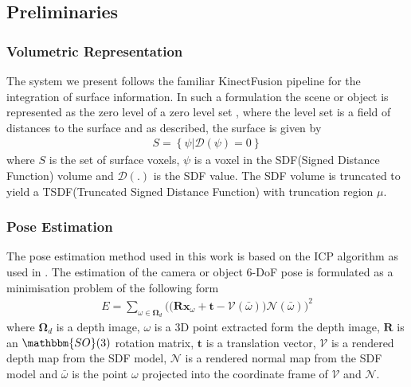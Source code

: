 \subsection{Preliminaries}
\subsubsection{Volumetric Representation}
The system we present follows the familiar KinectFusion \cite{Newcombe2011} pipeline for the integration of surface information. In such a 
formulation the scene or object is represented as the zero level of a zero level set \cite{Curless1996}, where the level set is a field of distances 
to the surface and as described, the surface is given by
\begin{equation}
\begin{split}
S = \left\{\psi | \mathcal{D}(\psi) = 0\right\}
\end{split}
\end{equation}
where $S$ is the set of surface voxels, $\psi$ is a voxel in the SDF(Signed Distance Function) volume and $\mathcal{D}(.)$ is the SDF value. 
The SDF volume is truncated to yield a TSDF(Truncated Signed Distance Function) with truncation region $\mu$.

\subsubsection{Pose Estimation}
The pose estimation method used in this work is based on the ICP algorithm as used in \cite{Newcombe2011, Prisacariu2014}. The estimation of 
the camera or object 6-DoF pose is formulated as a minimisation problem of the following form
\begin{equation}
\begin{split}
E = \sum_{\omega \in \mathbf{\Omega}_{d}} \bigg( \big( \mathbf{R}\mathbf{x}_{\omega} + \mathbf{t} - \mathcal{V}(\bar{\omega}) \big)\mathcal{N}(\bar{\omega}) \bigg)^{2}
\end{split}
\end{equation}
where $\mathbf{\Omega}_{d}$ is a depth image, $\omega$ is a 3D point extracted form the depth image, $\mathbf{R}$ is an  $\mathbbm{SO}(3)$ 
rotation matrix, $\mathbf{t}$ is a translation vector, $\mathcal{V}$ is a rendered depth map from the SDF model, $\mathcal{N}$ is a rendered 
normal map from the SDF model and $\bar{\omega}$ is the point $\omega$ projected into the coordinate frame of $\mathcal{V}$ and 
$\mathcal{N}$.

